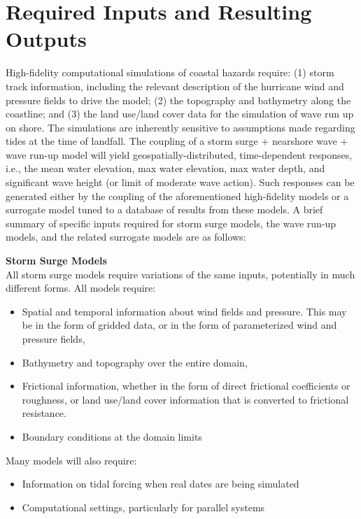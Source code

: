 \section{Required Inputs and Resulting Outputs}
\label{sec:storm_surge_io}

High-fidelity computational simulations of coastal hazards require: (1) storm track information, including the relevant description of the hurricane wind and pressure fields to drive the model; (2) the topography and bathymetry along the coastline; and (3) the land use/land cover data for the simulation of wave run up on shore. The simulations are inherently sensitive to assumptions made regarding tides at the time of landfall. The coupling of a storm surge + nearshore wave + wave run-up model will yield geospatially-distributed, time-dependent responses, i.e., the mean water elevation, max water elevation, max water depth, and significant wave height (or limit of moderate wave action). Such responses can be generated either by the coupling of the aforementioned high-fidelity models or a surrogate model tuned to a database of results from these models. A brief summary of specific inputs required for storm surge models, the wave run-up models, and the related surrogate models are as follows:
\newline

\noindent\textbf{Storm Surge Models} \\All storm surge models require variations of the same inputs, potentially in much different forms. All models require:

\begin{itemize}
    \item Spatial and temporal information about wind fields and pressure. This may be in the form of gridded data, or in the form of parameterized wind and pressure fields,
    \item Bathymetry and topography over the entire domain,
    \item Frictional information, whether in the form of direct frictional coefficients or roughness, or land use/land cover information that is converted to frictional resistance. 
    \item Boundary conditions at the domain limits
\end{itemize}

\noindent
Many models will also require:

\begin{itemize}
    \item Information on tidal forcing when real dates are being simulated
    \item Computational settings, particularly for parallel systems
\end{itemize}

